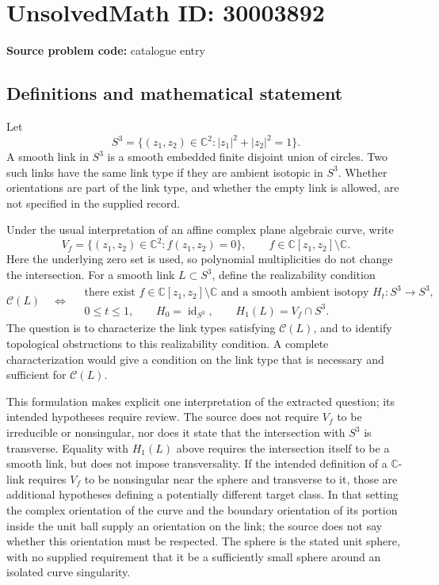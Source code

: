 \documentclass[11pt]{article}
\newcommand{\C}{\mathbb{C}}
\begin{document}
\section*{UnsolvedMath ID: 30003892}
\textbf{Source problem code:} catalogue entry
\subsection{Definitions and mathematical statement}
Let
\[
S^3=\{(z_1,z_2)\in\C^2:|z_1|^2+|z_2|^2=1\}.
\]
A smooth link in \(S^3\) is a smooth embedded finite disjoint union of circles. Two such links have the same link type if they are ambient isotopic in \(S^3\). Whether orientations are part of the link type, and whether the empty link is allowed, are not specified in the supplied record.

Under the usual interpretation of an affine complex plane algebraic curve, write
\[
V_f=\{(z_1,z_2)\in\C^2:f(z_1,z_2)=0\},
\qquad f\in\C[z_1,z_2]\setminus\C.
\]
Here the underlying zero set is used, so polynomial multiplicities do not change the intersection. For a smooth link \(L\subset S^3\), define the realizability condition
\[
\mathcal C(L)\quad\Longleftrightarrow\quad
\begin{gathered}
\text{there exist }f\in\C[z_1,z_2]\setminus\C
\text{ and a smooth ambient isotopy }H_t:S^3\longrightarrow S^3,\\
0\leq t\leq1,\qquad H_0=\operatorname{id}_{S^3},\qquad
H_1(L)=V_f\cap S^3.
\end{gathered}
\]
The question is to characterize the link types satisfying \(\mathcal C(L)\), and to identify topological obstructions to this realizability condition. A complete characterization would give a condition on the link type that is necessary and sufficient for \(\mathcal C(L)\).

This formulation makes explicit one interpretation of the extracted question; its intended hypotheses require review. The source does not require \(V_f\) to be irreducible or nonsingular, nor does it state that the intersection with \(S^3\) is transverse. Equality with \(H_1(L)\) above requires the intersection itself to be a smooth link, but does not impose transversality. If the intended definition of a \(\C\)-link requires \(V_f\) to be nonsingular near the sphere and transverse to it, those are additional hypotheses defining a potentially different target class. In that setting the complex orientation of the curve and the boundary orientation of its portion inside the unit ball supply an orientation on the link; the source does not say whether this orientation must be respected. The sphere is the stated unit sphere, with no supplied requirement that it be a sufficiently small sphere around an isolated curve singularity.
\end{document}
